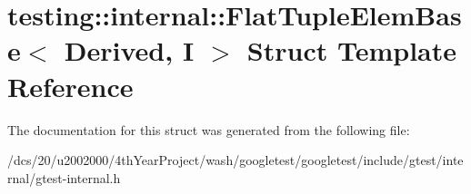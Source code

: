\hypertarget{structtesting_1_1internal_1_1FlatTupleElemBase}{}\section{testing\+:\+:internal\+:\+:Flat\+Tuple\+Elem\+Base$<$ Derived, I $>$ Struct Template Reference}
\label{structtesting_1_1internal_1_1FlatTupleElemBase}


The documentation for this struct was generated from the following file\+:\begin{DoxyCompactItemize}
\item 
/dcs/20/u2002000/4th\+Year\+Project/wash/googletest/googletest/include/gtest/internal/gtest-\/internal.\+h\end{DoxyCompactItemize}
